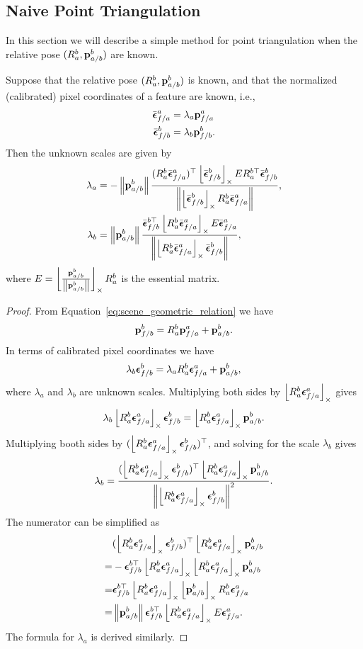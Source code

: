 \subsection{Naive Point Triangulation}
\label{sec:naive}
In this section we will describe a simple method for point triangulation when the relative pose $(R_a^b, \mathbf{p}_{a/b}^b)$ are known.
\begin{theorem}
	Suppose that the relative pose $(R_a^b, \mathbf{p}_{a/b}^b)$ is known, and that the normalized (calibrated) pixel coordinates of a feature are known, i.e.,
	\begin{align*}
	\bar{\boldsymbol{\epsilon}}_{f/a}^a &= \lambda_a \mathbf{p}_{f/a}^a \\
	\bar{\boldsymbol{\epsilon}}_{f/b}^b &= \lambda_b \mathbf{p}_{f/b}^b.
	\end{align*}
	Then the unknown scales are given by
	\begin{align*}
	\lambda_a &= -\left\|\mathbf{p}_{a/b}^b\right\|\frac{(R_a^b\bar{\boldsymbol{\epsilon}}_{f/a}^a)^\top \left\lfloor\bar{\boldsymbol{\epsilon}}_{f/b}^b\right\rfloor_{\times} E R_a^{b\top} \bar{\boldsymbol{\epsilon}}_{f/b}^b}
	{\left\|\left\lfloor\bar{\boldsymbol{\epsilon}}_{f/b}^b\right\rfloor_{\times}R_a^b\bar{\boldsymbol{\epsilon}}_{f/a}^a\right\|},
	\\
	\lambda_b &= \left\|\mathbf{p}_{a/b}^b\right\| \frac{\bar{\boldsymbol{\epsilon}}_{f/b}^{b\top}\left\lfloor R_a^b\bar{\boldsymbol{\epsilon}}_{f/a}^a\right\rfloor_{\times} E \bar{\boldsymbol{\epsilon}}_{f/a}^a}
	{\left\|\left\lfloor R_a^b\bar{\boldsymbol{\epsilon}}_{f/a}^a\right\rfloor_{\times}\bar{\boldsymbol{\epsilon}}_{f/b}^b\right\|},
	\end{align*}
	where $E=\left\lfloor\frac{\mathbf{p}_{a/b}^b}{\left\|\mathbf{p}_{a/b}^b\right\|}\right\rfloor_{\times}R_a^b$ is the essential matrix.
\end{theorem}
\begin{proof}
	From Equation~\eqref{eq:scene_geometric_relation}  we have
	\[
	\mathbf{p}_{f/b}^b = R_a^b \mathbf{p}_{f/a}^a + \mathbf{p}_{a/b}^b.
	\]
	In terms of calibrated pixel coordinates we have
	\[
	\lambda_b \boldsymbol{\epsilon}_{f/b}^b = \lambda_a R_a^b \boldsymbol{\epsilon}_{f/a}^a + \mathbf{p}_{a/b}^b,
	\]	
	where $\lambda_a$ and $\lambda_b$ are unknown scales.  
	Multiplying both sides by $\left\lfloor R_a^b \boldsymbol{\epsilon}_{f/a}^a\right\rfloor_{\times}$ gives
	\[
	\lambda_b \left\lfloor R_a^b \boldsymbol{\epsilon}_{f/a}^a\right\rfloor_{\times} \boldsymbol{\epsilon}_{f/b}^b  = \left\lfloor R_a^b \boldsymbol{\epsilon}_{f/a}^a\right\rfloor_{\times} \mathbf{p}_{a/b}^b.
	\]	
	Multiplying booth sides by $(\left\lfloor R_a^b \boldsymbol{\epsilon}_{f/a}^a\right\rfloor_{\times} \boldsymbol{\epsilon}_{f/b}^b)^\top$, and solving for the scale $\lambda_b$ gives
	\[
	\lambda_b = \frac{(\left\lfloor R_a^b \boldsymbol{\epsilon}_{f/a}^a\right\rfloor_{\times} \boldsymbol{\epsilon}_{f/b}^b)^\top \left\lfloor R_a^b \boldsymbol{\epsilon}_{f/a}^a\right\rfloor_{\times} \mathbf{p}_{a/b}^b}{\left\|\left\lfloor R_a^b \boldsymbol{\epsilon}_{f/a}^a\right\rfloor_{\times} \boldsymbol{\epsilon}_{f/b}^b\right\|^2}.
	\]
	The numerator can be simplified as
	\begin{align*}
	& (\left\lfloor R_a^b \boldsymbol{\epsilon}_{f/a}^a\right\rfloor_{\times} \boldsymbol{\epsilon}_{f/b}^b)^\top \left\lfloor R_a^b \boldsymbol{\epsilon}_{f/a}^a\right\rfloor_{\times} \mathbf{p}_{a/b}^b \\
	=& -\boldsymbol{\epsilon}_{f/b}^{b\top} \left\lfloor R_a^b \boldsymbol{\epsilon}_{f/a}^a\right\rfloor_{\times}  \left\lfloor R_a^b \boldsymbol{\epsilon}_{f/a}^a\right\rfloor_{\times} \mathbf{p}_{a/b}^b \\
	=& \boldsymbol{\epsilon}_{f/b}^{b\top} \left\lfloor R_a^b \boldsymbol{\epsilon}_{f/a}^a\right\rfloor_{\times} \left\lfloor\mathbf{p}_{a/b}^b\right\rfloor_{\times} R_a^b \boldsymbol{\epsilon}_{f/a}^a  \\
	=& \left\|\mathbf{p}_{a/b}^b\right\| \boldsymbol{\epsilon}_{f/b}^{b\top} \left\lfloor R_a^b \boldsymbol{\epsilon}_{f/a}^a\right\rfloor_{\times} E \boldsymbol{\epsilon}_{f/a}^a.
	\end{align*}
	The formula for $\lambda_a$ is derived similarly.
\end{proof}

